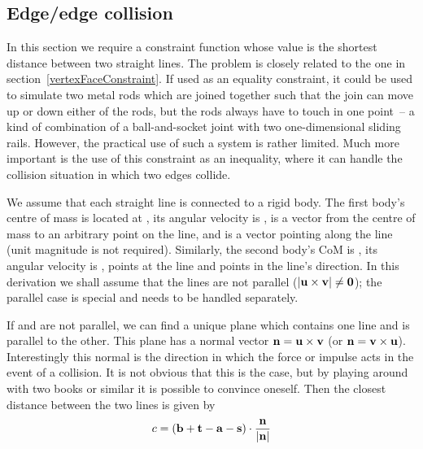 \subsection{Edge/edge collision\label{edgeEdgeConstraint}}

In this section we require a constraint function whose value is the shortest distance between
two straight lines. The problem is closely related to the one in
section~\ref{vertexFaceConstraint}. If used as an equality constraint, it could be used to
simulate two metal rods which are joined together such that the join can move up or down either
of the rods, but the rods always have to touch in one point~-- a kind of combination of a
ball-and-socket joint with two one-dimensional sliding rails. However, the practical use of such
a system is rather limited. Much more important is the use of this constraint as an inequality,
where it can handle the collision situation in which two edges collide.

We assume that each straight line is connected to a rigid body. The first body's centre of mass
is located at , its angular velocity is \ve{\omega},  is a vector from the centre
of mass to an arbitrary point on the line, and  is a vector pointing along the line (unit
magnitude is not required). Similarly, the second body's CoM is , its angular velocity is
\ve{\phi},  points at the line and  points in the line's direction. In this
derivation we shall assume that the lines are not parallel
($\norm{\ve{u}\times\ve{v}} \ne \ve{0}$); the parallel case is special and needs to be handled
separately.

If  and  are not parallel, we can find a unique plane which contains one line and is
parallel to the other. This plane has a normal vector $\ve{n} = \ve{u}\times\ve{v}$ (or
$\ve{n} = \ve{v}\times\ve{u}$). Interestingly this normal is the direction in which the force or
impulse acts in the event of a collision. It is not obvious that this is the case, but by playing
around with two books or similar it is possible to convince oneself. Then the closest distance
between the two lines is given by
\begin{equation}
c = (\ve{b} + \ve{t} - \ve{a} - \ve{s})\cdot\frac{\ve{n}}{\norm{\ve{n}}}
\end{equation}

